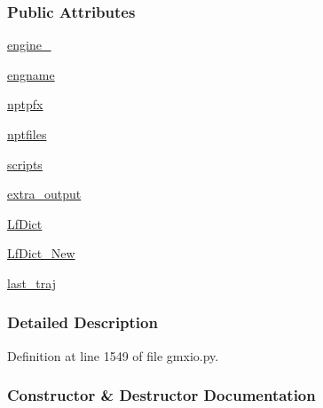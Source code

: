 \subsubsection*{Public Attributes}
\begin{DoxyCompactItemize}
\item 
\hyperlink{classsrc_1_1gmxio_1_1Lipid__GMX_a843f7ba7e47c1de4621a830574020a7f}{engine\+\_\+}
\item 
\hyperlink{classsrc_1_1gmxio_1_1Lipid__GMX_ab6c293169bd729a05d8d248d871724ca}{engname}
\item 
\hyperlink{classsrc_1_1gmxio_1_1Lipid__GMX_afcf5107a93cf2b9bef006e7ea8327b0e}{nptpfx}
\item 
\hyperlink{classsrc_1_1gmxio_1_1Lipid__GMX_af9db8d98e9f02780b5e61e89cde11cca}{nptfiles}
\item 
\hyperlink{classsrc_1_1gmxio_1_1Lipid__GMX_af208f1d0f5828a33220e239cbab1f02a}{scripts}
\item 
\hyperlink{classsrc_1_1gmxio_1_1Lipid__GMX_a442c27e1a679ccb60a93402cfa2c5390}{extra\+\_\+output}
\item 
\hyperlink{classsrc_1_1gmxio_1_1Lipid__GMX_af117d5c708af4268074d3ef8df657722}{Lf\+Dict}
\item 
\hyperlink{classsrc_1_1gmxio_1_1Lipid__GMX_a83d0794209c3903f2d74a785171e2b79}{Lf\+Dict\+\_\+\+New}
\item 
\hyperlink{classsrc_1_1gmxio_1_1Lipid__GMX_a8df28c88fff41bf1bb5006af5690e396}{last\+\_\+traj}
\end{DoxyCompactItemize}


\subsubsection{Detailed Description}


Definition at line 1549 of file gmxio.\+py.



\subsubsection{Constructor \& Destructor Documentation}
\mbox{\label{classsrc_1_1gmxio_1_1Lipid__GMX_a1259adba80d54fa54232b7a475d74adf}} 
